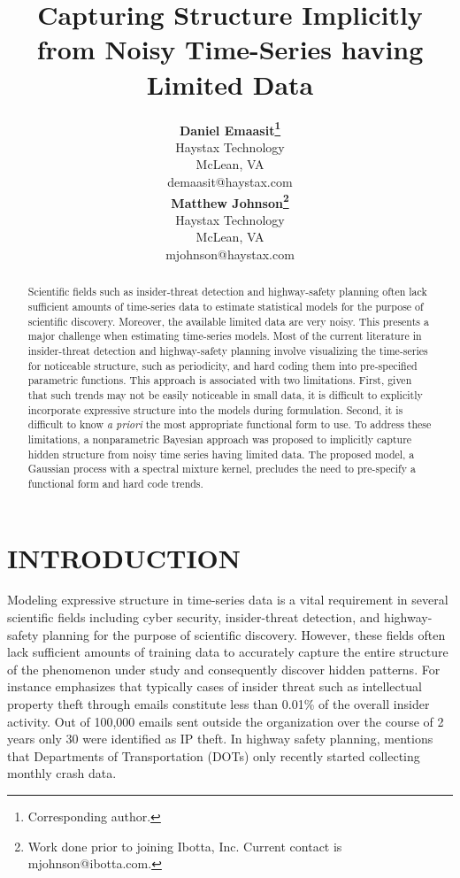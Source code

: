 \documentclass[letterpaper]{article}
\title{Capturing Structure Implicitly from Noisy Time-Series having Limited Data}
\author{} %
\author{ {\bf Daniel Emaasit\thanks{Corresponding author.}} \\
Haystax Technology \\
McLean, VA    \\
demaasit@haystax.com\\
\And
{\bf Matthew Johnson\thanks{Work done prior to joining Ibotta, Inc. Current contact is mjohnson@ibotta.com.}}   \\
Haystax Technology \\
McLean, VA    \\
mjohnson@haystax.com\\
}
\begin{document}
\maketitle

\begin{abstract}
Scientific fields such as insider-threat detection and highway-safety planning often lack sufficient amounts of time-series data to estimate statistical models for the purpose of scientific discovery. Moreover, the available limited data are very noisy. This presents a major challenge when estimating time-series models. Most of the current literature in insider-threat detection and highway-safety planning involve visualizing the time-series for noticeable structure, such as periodicity, and hard coding them into pre-specified parametric functions. This approach is associated with two limitations. First, given that such trends may not be easily noticeable in small data, it is difficult to explicitly incorporate expressive structure into the models during formulation.  Second, it is difficult to know \textit{a priori} the most appropriate functional form to use. To address these limitations, a nonparametric Bayesian approach was proposed to implicitly capture hidden structure from noisy time series having limited data. The proposed model, a Gaussian process with a spectral mixture kernel, precludes the need to pre-specify a functional form and hard code trends.%
\end{abstract}

\section{INTRODUCTION}

Modeling expressive structure in time-series data is a vital requirement in several scientific fields including cyber security, insider-threat detection, and highway-safety planning for the purpose of scientific discovery. However, these fields often lack sufficient amounts of training data to accurately capture the entire structure of the phenomenon under study and consequently discover hidden patterns. For instance \cite{schrag2016probabilistic} emphasizes that typically cases of insider threat such as intellectual property theft through emails constitute less than 0.01\% of the overall insider activity. Out of 100,000 emails sent outside the organization over the course of 2 years only 30 were identified as IP theft. In highway safety planning, \cite{veeramisti2016business} mentions that Departments of Transportation (DOTs) only recently started collecting monthly crash data. 
\end{document}
